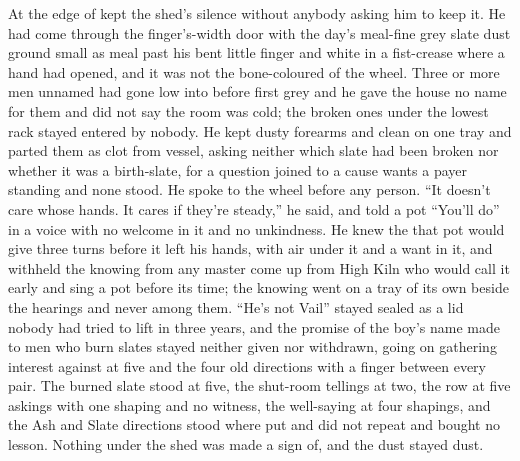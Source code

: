 At the edge of   kept the shed's silence without anybody asking him to keep it. He had come through the finger's-width door with the day's meal-fine grey slate dust ground small as meal past his bent little finger and white in a fist-crease where a hand had opened, and it was not the bone-coloured  of the wheel. Three or more men unnamed had gone low into  before first grey and he gave the house no name for them and did not say the room was cold; the broken ones under the lowest rack stayed entered by nobody. He kept dusty forearms and clean on one tray and parted them as clot from vessel, asking neither which slate had been broken nor whether it was a birth-slate, for a question joined to a cause wants a payer standing and none stood. He spoke to the wheel before any person. “It doesn't care whose hands. It cares if they're steady,” he said, and told a pot “You'll do” in a voice with no welcome in it and no unkindness. He knew the  that pot would give three turns before it left his hands, with air under it and a want in it, and withheld the knowing from any master come up from High Kiln who would call it early and sing a pot before its time; the knowing went on a tray of its own beside the hearings and never among them. “He's not Vail” stayed sealed as a lid nobody had tried to lift in three years, and the promise of the boy's name made to men who burn slates stayed neither given nor withdrawn, going on gathering interest against  at five and the four old directions with a finger between every pair. The burned slate stood at five, the shut-room tellings at two, the row at five askings with one shaping and no witness, the well-saying at four shapings, and the Ash and Slate directions stood where put and did not repeat and bought no lesson. Nothing under the shed was made a sign of, and the dust stayed dust.

\scenebreak

